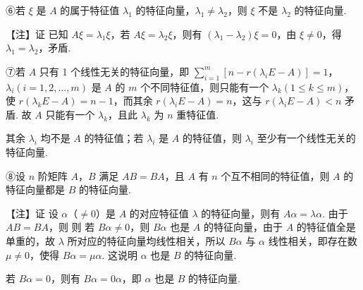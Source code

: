 ⑥若 $\xi$ 是 $A$ 的属于特征值 $\lambda_1$ 的特征向量，$\lambda_1\ne\lambda_2$，则 $\xi$ 不是 $\lambda_2$ 的特征向量.

\begin{fnote}
【注】证 已知 $A\xi=\lambda_1\xi$，若 $A\xi=\lambda_2\xi$，则有 $(\lambda_1-\lambda_2)\xi=0$，由 $\xi\ne0$，得 $\lambda_1=\lambda_2$，矛盾.
\end{fnote}

⑦若 $A$ 只有 1 个线性无关的特征向量，即 $\sum\limits_{i=1}^{m}[n-r(\lambda_iE-A)]=1$，$\lambda_i(i=1,2,\dots,m)$ 是 $A$ 的 $m$ 个不同特征值，则只能有一个 $\lambda_k(1\le k\le m)$，使 $r(\lambda_kE-A)=n-1$，而其余 $r(\lambda_iE-A)=n$，这与 $r(\lambda_iE-A)<n$ 矛盾. 故 $A$ 只能有一个 $\lambda_k$，且此 $\lambda_k$ 为 $n$ 重特征值.

\begin{fnote}
其余 $\lambda_i$ 均不是 $A$ 的特征值；若 $\lambda_i$ 是 $A$ 的特征值，则 $\lambda_i$ 至少有一个线性无关的特征向量.
\end{fnote}

⑧设 $n$ 阶矩阵 $A$，$B$ 满足 $AB=BA$，且 $A$ 有 $n$ 个互不相同的特征值，则 $A$ 的特征向量都是 $B$ 的特征向量.

\begin{fnote}
【注】证 设 $\alpha$（$\ne0$）是 $A$ 的对应特征值 $\lambda$ 的特征向量，则有 $A\alpha=\lambda\alpha$. 由于 $AB=BA$，则
则
若 $B\alpha\ne0$，则 $B\alpha$ 也是 $A$ 的特征向量，由于 $A$ 的特征值全是单重的，故 $\lambda$ 所对应的特征向量均线性相关，所以 $B\alpha$ 与 $\alpha$ 线性相关，即存在数 $\mu\ne0$，使得 $B\alpha=\mu\alpha$. 这说明 $\alpha$ 也是 $B$ 的特征向量.

若 $B\alpha=0$，则有 $B\alpha=0\alpha$，即 $\alpha$ 也是 $B$ 的特征向量.
\end{fnote}

